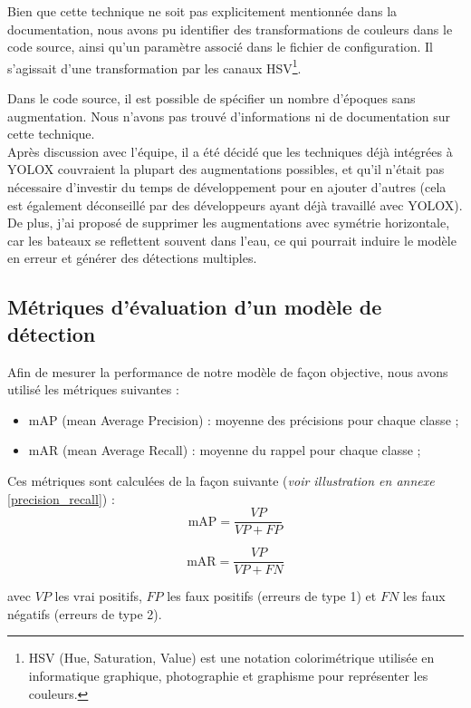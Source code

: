 Bien que cette technique ne soit pas explicitement mentionnée dans la documentation,
nous avons pu identifier des transformations de couleurs dans le code source,
ainsi qu'un paramètre associé dans le fichier de configuration. Il s'agissait 
d'une transformation par les canaux HSV\footnote{HSV (Hue, Saturation, Value) est une notation colorimétrique utilisée en informatique graphique, photographie et graphisme pour représenter les couleurs.}.

Dans le code source, il est possible de spécifier un nombre d'époques sans augmentation. Nous n'avons pas trouvé d'informations ni de documentation sur cette technique.\\

Après discussion avec l'équipe, il a été décidé que les techniques déjà intégrées à YOLOX
couvraient la plupart des augmentations possibles, et qu'il n'était pas nécessaire d'investir
du temps de développement pour en ajouter d'autres (cela est également déconseillé
par des développeurs ayant déjà travaillé avec YOLOX).\\
De plus, j'ai proposé de supprimer les augmentations avec symétrie horizontale, car les bateaux
se reflettent souvent dans l'eau, ce qui pourrait induire le modèle en erreur et 
générer des détections multiples. 

\subsection{Métriques d'évaluation d'un modèle de détection}

Afin de mesurer la performance de notre modèle de façon objective,
nous avons utilisé les métriques suivantes :
\begin{itemize}
    \item mAP (mean Average Precision) : moyenne des précisions pour chaque classe ;
    \item mAR (mean Average Recall) : moyenne du rappel pour chaque classe ;
\end{itemize}

Ces métriques sont calculées de la façon suivante (\textit{voir illustration en annexe }
\ref{precision_recall}) :\\

$$
\text{mAP} = \frac{VP}{VP + FP}
$$

$$
\text{mAR} = \frac{VP}{VP + FN}
$$

avec $VP$ les vrai positifs, $FP$ les faux positifs (erreurs de type 1) et 
$FN$ les faux négatifs (erreurs de type 2).\\


